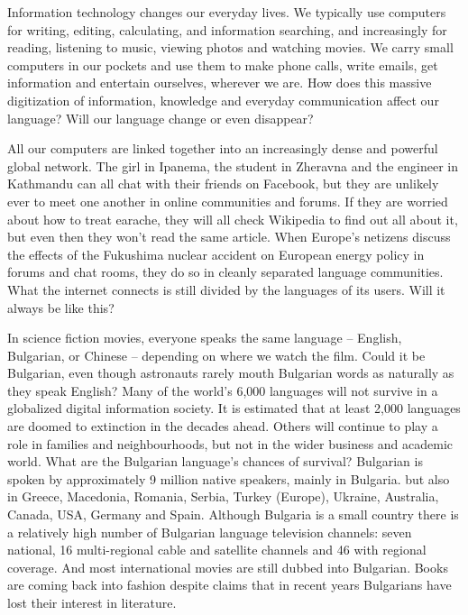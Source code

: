 \begin{multicols}{2}
Information technology changes our everyday lives. We typically use computers for writing, editing, calculating, and information searching, and increasingly for reading, listening to music, viewing photos and watching movies. We carry small computers in our pockets and use them to make phone calls, write emails, get information and entertain ourselves, wherever we are. How does this massive digitization of information, knowledge and everyday communication affect our language? Will our language change or even disappear?

All our computers are linked together into an increasingly dense and powerful global network. The girl in Ipanema, the student in Zheravna and the engineer in Kathmandu can all chat with their friends on Facebook, but they are unlikely ever to meet one another in online communities and forums. If they are worried about how to treat earache, they will all check Wikipedia to find out all about it, but even then they won’t read the same article. When Europe's netizens discuss the effects of the Fukushima nuclear accident on European energy policy in forums and chat rooms, they do so in cleanly separated language communities. What the internet connects is still divided by the languages of its users. Will it always be like this? 

In science fiction movies, everyone speaks the same language -- English, Bulgarian, or Chinese -- depending on where we watch the film. Could it be Bulgarian, even though astronauts rarely mouth Bulgarian words as naturally as they speak English? Many of the world’s 6,000 languages will not survive in a globalized digital information society. It is estimated that at least 2,000 languages are doomed to extinction in the decades ahead. Others will continue to play a role in families and neighbourhoods, but not in the wider business and academic world. What are the Bulgarian language’s chances of survival? 
Bulgarian is spoken by approximately 9 million native speakers, mainly in Bulgaria. but also in Greece, Macedonia, Romania, Serbia, Turkey (Europe), Ukraine, Australia, Canada, USA, Germany and Spain. Although Bulgaria is a small country there is a relatively high number of Bulgarian language television channels: seven national, 16 multi-regional cable and satellite channels and 46 with regional coverage. And most international movies are still dubbed into Bulgarian. Books are coming back into fashion despite claims that in recent years Bulgarians have lost their interest in literature.


\end{multicols}
